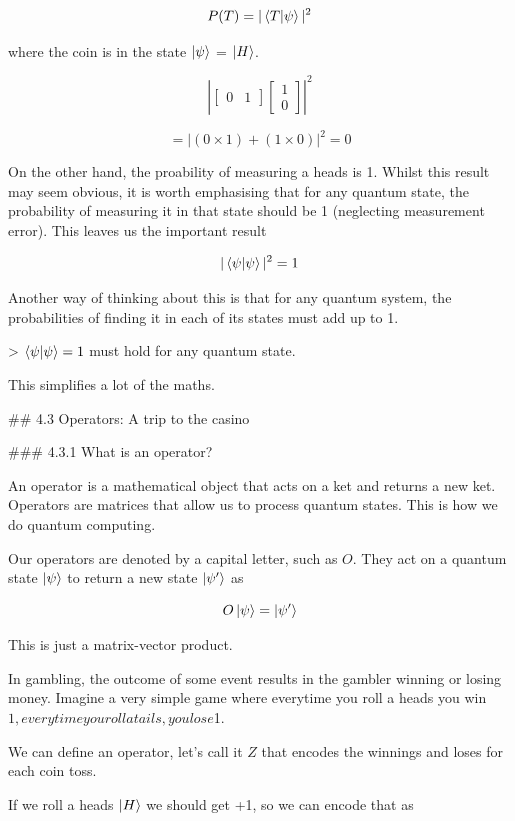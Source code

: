\documentclass{book}
\begin{document}
$$ P(T) = |\braket{T|\psi}|^2 $$ 

where the coin is in the state $\ket{\psi}$ = $\ket{H}$. 

$$  
\left| \begin{bmatrix} 0 & 1 \end{bmatrix} \begin{bmatrix} 1 \\ 0 \end{bmatrix} \right|^2 
$$

$$
= \left| (0 \times 1) + (1 \times 0) \right|^2 = 0 
$$


On the other hand, the proability of measuring a heads is 1. Whilst this result may seem obvious, it is worth emphasising that for any quantum state, the probability of measuring it in that state should be 1 (neglecting measurement error). This leaves us the important result

$$ |\braket{\psi|\psi}|^2 = 1 $$

Another way of thinking about this is that for any quantum system, the probabilities of finding it in each of its states must add up to 1. 

> $ \braket{\psi|\psi} = 1 $ must hold for any quantum state. 

This simplifies a lot of the maths. 

## 4.3 Operators: A trip to the casino 

### 4.3.1 What is an operator?

An operator is a mathematical object that acts on a ket and returns a new ket. Operators are matrices that allow us to process quantum states. This is how we do quantum computing. 

Our operators are denoted by a capital letter, such as  $O$. They act on a quantum state $\ket{\psi}$ to return a new state $\ket{\psi'}$ as 

$$O\ket{\psi} = \ket{\psi'}$$

This is just a matrix-vector product. 



In gambling, the outcome of some event results in the gambler winning or losing money. Imagine a very simple game where everytime you roll a heads you win $1, everytime you roll a tails, you lose $1. 

We can define an operator, let's call it $Z$ that encodes the winnings and loses for each coin toss. 

If we roll a heads $\ket{H}$ we should get +1, so we can encode that as 
\end{document}
